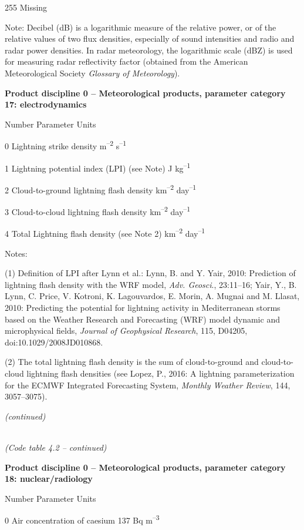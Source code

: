 255 Missing

Note: Decibel (dB) is a logarithmic measure of the relative power, or of the relative values of two flux densities, especially of sound intensities and radio and radar power densities. In radar meteorology, the logarithmic scale (dBZ) is used for measuring radar reflectivity factor (obtained from the American Meteorological Society \emph{Glossary of Meteorology}).

\textbf{Product discipline 0 -- Meteorological products, parameter category 17: electrodynamics}

Number Parameter Units

0 Lightning strike density m\textsuperscript{--2} s\textsuperscript{--1}

1 Lightning potential index (LPI) (see Note) J kg\textsuperscript{--1}

2 Cloud-to-ground lightning flash density km\textsuperscript{--2} day\textsuperscript{--1}

3 Cloud-to-cloud lightning flash density km\textsuperscript{--2} day\textsuperscript{--1}

4 Total Lightning flash density (see Note 2) km\textsuperscript{--2} day\textsuperscript{--1}

Notes:

(1) Definition of LPI after Lynn et al.: Lynn, B. and Y. Yair, 2010: Prediction of lightning flash density with the WRF model, \emph{Adv. Geosci}., 23:11--16; Yair, Y., B. Lynn, C. Price, V. Kotroni, K. Lagouvardos, E. Morin, A. Mugnai and M. Llasat, 2010: Predicting the potential for lightning activity in Mediterranean storms based on the Weather Research and Forecasting (WRF) model dynamic and microphysical fields, \emph{Journal of Geophysical Research}, 115, D04205, doi:10.1029/2008JD010868.

(2) The total lightning flash density is the sum of cloud-to-ground and cloud-to-cloud lightning flash densities (see Lopez, P., 2016: A lightning parameterization for the ECMWF Integrated Forecasting System, \emph{Monthly Weather Review}, 144, 3057--3075).

\emph{(continued)}

\emph{\\
(Code table 4.2 -- continued)}

\textbf{Product discipline 0 -- Meteorological products, parameter category 18: nuclear/radiology}

Number Parameter Units

0 Air concentration of caesium 137 Bq m\textsuperscript{--3}

